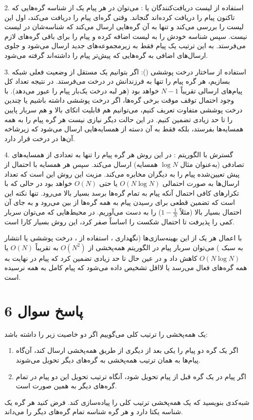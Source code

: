 2. استفاده از لیست دریافت‌کنندگان یا :  
   می‌توان در هر پیام یک  از شناسه گره‌هایی که تاکنون پیام را دریافت کرده‌اند گنجاند. وقتی گره‌ای پیام را دریافت می‌کند، اول این لیست را بررسی می‌کند و تنها به آن گره‌هایی ارسال می‌کند که شناسه‌شان در لیست نیست. سپس شناسه خودش را به لیست اضافه کرده و پیام را برای باقی گره‌های لازم می‌فرستد. به این ترتیب یک پیام فقط به زیرمجموعه‌های جدید ارسال می‌شود و جلوی ارسال‌های اضافی به گره‌هایی که پیش‌تر پیام را داشته‌اند گرفته می‌شود.

3. استفاده از ساختار درخت پوششی ():  
   اگر بتوانیم یک  مستقل از وضعیت فعلی شبکه بسازیم، هر گره پیام را تنها به فرزندانش در درخت می‌فرستد. در نتیجه تعداد کل پیام‌های ارسالی تقریباً \(N-1\) خواهد بود (هر لبه درخت یک‌بار پیام را عبور می‌دهد). با وجود احتمال توقف موقت برخی گره‌ها، اگر درخت پوششی  داشته باشیم یا چندین درخت پوششی متفاوت تعریف کنیم، می‌توانیم هم قابلیت اتکای بالا و هم سربار پایین را تا حد زیادی تضمین کنیم. در این حالت دیگر نیازی نیست هر گره پیام را به همه همسایه‌ها بفرستد، بلکه فقط به آن دسته از همسایه‌هایی ارسال می‌شود که زیرشاخه آن‌ها در درخت قرار دارد.

4. گسترش با الگوریتم :  
   در این روش هر گره پیام را تنها به تعدادی از همسایه‌های تصادفی (به‌عنوان مثال \(\log N\) همسایه) ارسال می‌کند. سپس هر همسایه با احتمال از پیش تعیین‌شده پیام را به دیگران مخابره می‌کند. مزیت این روش این است که تعداد ارسال‌ها به صورت احتمالی \(O(N \log N)\) یا حتی \(O(N)\) خواهد بود در حالی که با تکرارهای کافی احتمال آنکه پیام به تمام گره‌ها برسد بسیار بالا می‌رود. تنها نکته این است که تضمین قطعی برای رسیدن پیام به همه گره‌ها از بین می‌رود و به جای آن احتمال بسیار بالا (مثلاً \(1 - \frac{1}{N}\)) را به دست می‌آوریم. در محیط‌هایی که می‌توان سربار کمی را پذیرفت تا احتمال شکست را اساساً صفر کرد، این روش بسیار کارا است.

با اعمال هر یک از این بهینه‌سازی‌ها (نگهداری ، استفاده از ، درخت پوششی یا انتشار به سبک ) می‌توان سربار پیام در الگوریتم همه‌پخشی از \(O(N^2)\) به تقریباً \(O(N)\) یا \(O(N \log N)\) کاهش داد و در عین حال تا حد زیادی تضمین کرد که پیام در نهایت به همه گره‌های فعال می‌رسد یا لااقل تشخیص داده می‌شود که پیام کامل به همه نرسیده است.


\section*{پاسخ سوال 6}
\noindent
یک همه‌پخشی را ترتیب کلی  می‌گوییم اگر دو خاصیت زیر را داشته باشد:
\begin{enumerate}
    \item اگر یک گره دو پیام را یکی بعد از دیگری از طریق همه‌پخشی ارسال کند، آن‌گاه پیام‌ها به همان ترتیب همه‌پخشی به گره‌های دیگر تحویل می‌شوند.
    \item اگر پیام  در یک گره قبل از پیام  تحویل شود، آنگاه ترتیب تحویل این دو پیام در تمام گره‌های دیگر به همین صورت است.
\end{enumerate}
شبه‌کدی بنویسید که یک همه‌پخشی ترتیب کلی  را پیاده‌سازی کند. فرض کنید هر گره یک شناسه یکتا دارد و هر گره شناسه تمام گره‌های دیگر را می‌داند.


